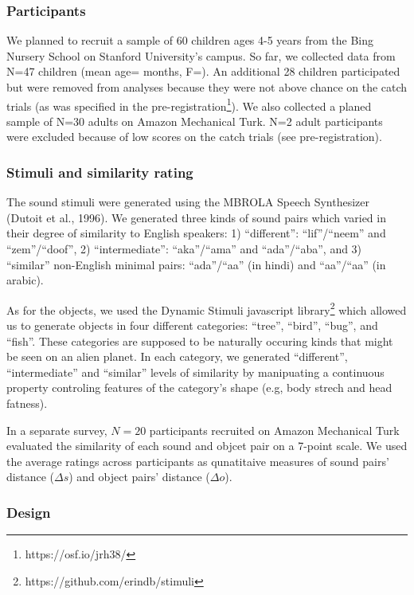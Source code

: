 \documentclass[10pt, letterpaper]{article}
\begin{document}
\subsubsection{Participants}\label{participants}

We planned to recruit a sample of 60 children ages 4-5 years from the
Bing Nursery School on Stanford University's campus. So far, we
collected data from N=47 children (mean age= months, F=). An additional
28 children participated but were removed from analyses because they
were not above chance on the catch trials (as was specified in the
pre-registration\footnote{https://osf.io/jrh38/}). We also collected a
planed sample of N=30 adults on Amazon Mechanical Turk. N=2 adult
participants were excluded because of low scores on the catch trials
(see pre-registration).

\subsubsection{Stimuli and similarity
rating}\label{stimuli-and-similarity-rating}

The sound stimuli were generated using the MBROLA Speech Synthesizer
(Dutoit et al., 1996). We generated three kinds of sound pairs which
varied in their degree of similarity to English speakers: 1)
``different'': ``lif''/``neem'' and ``zem''/``doof'', 2)
``intermediate'': ``aka''/``ama'' and ``ada''/``aba'', and 3)
``similar'' non-English minimal pairs: ``ada''/``aa''
(in hindi) and ``aa''/``a\textipa{\textcrh}a'' (in arabic).

As for the objects, we used the Dynamic Stimuli javascript
library\footnote{https://github.com/erindb/stimuli} which allowed us to
generate objects in four different categories: ``tree'', ``bird'',
``bug'', and ``fish''. These categories are supposed to be naturally
occuring kinds that might be seen on an alien planet. In each category,
we generated ``different'', ``intermediate'' and ``similar'' levels of
similarity by manipuating a continuous property controling features of
the category's shape (e.g, body strech and head fatness).

In a separate survey, \(N=20\) participants recruited on Amazon
Mechanical Turk evaluated the similarity of each sound and objcet pair
on a 7-point scale. We used the average ratings across participants as
qunatitaive measures of sound pairs' distance (\(\Delta s\)) and object
pairs' distance (\(\Delta o\)).

\subsubsection{Design}\label{design}
\end{document}
